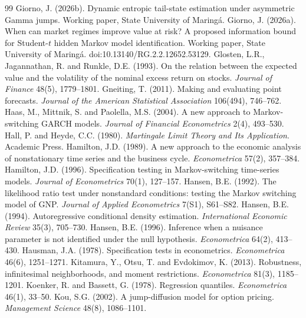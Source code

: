 \documentclass[11pt,a4paper]{article}
\theoremstyle{definition}
\theoremstyle{remark}
\begin{document}
\begin{thebibliography}{99}
 Giorno, J. (2026b). Dynamic entropic tail-state estimation under asymmetric Gamma jumps. Working paper, State University of Maring\'a.
 Giorno, J. (2026a). When can market regimes improve value at risk? A proposed information bound for Student-$t$ hidden Markov model identification. Working paper, State University of Maring\'a. doi:10.13140/RG.2.2.12652.53129.
 Glosten, L.R., Jagannathan, R. and Runkle, D.E. (1993). On the relation between the expected value and the volatility of the nominal excess return on stocks. \emph{Journal of Finance} 48(5), 1779--1801.
 Gneiting, T. (2011). Making and evaluating point forecasts. \emph{Journal of the American Statistical Association} 106(494), 746--762.
 Haas, M., Mittnik, S. and Paolella, M.S. (2004). A new approach to Markov-switching GARCH models. \emph{Journal of Financial Econometrics} 2(4), 493--530.
 Hall, P. and Heyde, C.C. (1980). \emph{Martingale Limit Theory and Its Application}. Academic Press.
 Hamilton, J.D. (1989). A new approach to the economic analysis of nonstationary time series and the business cycle. \emph{Econometrica} 57(2), 357--384.
 Hamilton, J.D. (1996). Specification testing in Markov-switching time-series models. \emph{Journal of Econometrics} 70(1), 127--157.
 Hansen, B.E. (1992). The likelihood ratio test under nonstandard conditions: testing the Markov switching model of GNP. \emph{Journal of Applied Econometrics} 7(S1), S61--S82.
 Hansen, B.E. (1994). Autoregressive conditional density estimation. \emph{International Economic Review} 35(3), 705--730.
 Hansen, B.E. (1996). Inference when a nuisance parameter is not identified under the null hypothesis. \emph{Econometrica} 64(2), 413--430.
 Hausman, J.A. (1978). Specification tests in econometrics. \emph{Econometrica} 46(6), 1251--1271.
 Kitamura, Y., Otsu, T. and Evdokimov, K. (2013). Robustness, infinitesimal neighborhoods, and moment restrictions. \emph{Econometrica} 81(3), 1185--1201.
 Koenker, R. and Bassett, G. (1978). Regression quantiles. \emph{Econometrica} 46(1), 33--50.
 Kou, S.G. (2002). A jump-diffusion model for option pricing. \emph{Management Science} 48(8), 1086--1101.

\end{thebibliography}
\end{document}
